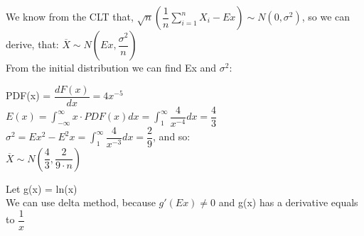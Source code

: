 \documentclass[12pt]{article}
\begin{document}
\begin{list}{()~}{}
\item
We know from the CLT that, $\sqrt{n}\left(\dfrac{1}{n} \sum^{n}_{i = 1} X_i - Ex\right) \sim N(0,\sigma^2)$, so we can derive, that: $\overline{X} \sim N\left(Ex, \dfrac{\sigma^2}{n}\right)$\\

From the initial distribution we can find Ex and $\sigma^2$:

PDF(x) = $\dfrac{d F(x)}{dx} = 4 x^{-5}$\\
$E(x) = \int_{-\infty}^{\infty} x \cdot PDF(x) dx = \int_{1}^{\infty} \dfrac{4}{x^{-4}} dx = \dfrac{4}{3}$ \\
$\sigma^2 = Ex^2 - E^2x = \int_{1}^{\infty} \dfrac{4}{x^{-3}} dx = \dfrac{2}{9}$, and so:\\
$\overline{X} \sim N\left(\dfrac{4}{3}, \dfrac{2}{9 \cdot n}\right)$\\
\item
Let g(x) = ln(x)\\

We can use delta method, because $g'(Ex) \neq 0$ and g(x) has a derivative equals to $\dfrac{1}{x}$


\end{list}
\end{document}

